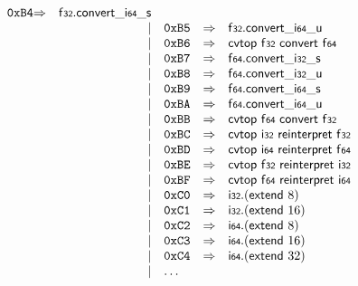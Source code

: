 $$\begin{array}{@{}l@{}rrlll@{}l@{}}
\mathtt{0xB4} &\Rightarrow& \mathsf{f{\scriptstyle32}} . {{{{\mathsf{convert}}{\mathsf{\_}}}{\mathsf{i{\scriptstyle64}}}}{\mathsf{\_}}}{\mathsf{s}} \\ &&|&
\mathtt{0xB5} &\Rightarrow& \mathsf{f{\scriptstyle32}} . {{{{\mathsf{convert}}{\mathsf{\_}}}{\mathsf{i{\scriptstyle64}}}}{\mathsf{\_}}}{\mathsf{u}} \\ &&|&
\mathtt{0xB6} &\Rightarrow& \mathsf{cvtop}~\mathsf{f{\scriptstyle32}}~\mathsf{convert}~\mathsf{f{\scriptstyle64}} \\ &&|&
\mathtt{0xB7} &\Rightarrow& \mathsf{f{\scriptstyle64}} . {{{{\mathsf{convert}}{\mathsf{\_}}}{\mathsf{i{\scriptstyle32}}}}{\mathsf{\_}}}{\mathsf{s}} \\ &&|&
\mathtt{0xB8} &\Rightarrow& \mathsf{f{\scriptstyle64}} . {{{{\mathsf{convert}}{\mathsf{\_}}}{\mathsf{i{\scriptstyle32}}}}{\mathsf{\_}}}{\mathsf{u}} \\ &&|&
\mathtt{0xB9} &\Rightarrow& \mathsf{f{\scriptstyle64}} . {{{{\mathsf{convert}}{\mathsf{\_}}}{\mathsf{i{\scriptstyle64}}}}{\mathsf{\_}}}{\mathsf{s}} \\ &&|&
\mathtt{0xBA} &\Rightarrow& \mathsf{f{\scriptstyle64}} . {{{{\mathsf{convert}}{\mathsf{\_}}}{\mathsf{i{\scriptstyle64}}}}{\mathsf{\_}}}{\mathsf{u}} \\ &&|&
\mathtt{0xBB} &\Rightarrow& \mathsf{cvtop}~\mathsf{f{\scriptstyle64}}~\mathsf{convert}~\mathsf{f{\scriptstyle32}} \\ &&|&
\mathtt{0xBC} &\Rightarrow& \mathsf{cvtop}~\mathsf{i{\scriptstyle32}}~\mathsf{reinterpret}~\mathsf{f{\scriptstyle32}} \\ &&|&
\mathtt{0xBD} &\Rightarrow& \mathsf{cvtop}~\mathsf{i{\scriptstyle64}}~\mathsf{reinterpret}~\mathsf{f{\scriptstyle64}} \\ &&|&
\mathtt{0xBE} &\Rightarrow& \mathsf{cvtop}~\mathsf{f{\scriptstyle32}}~\mathsf{reinterpret}~\mathsf{i{\scriptstyle32}} \\ &&|&
\mathtt{0xBF} &\Rightarrow& \mathsf{cvtop}~\mathsf{f{\scriptstyle64}}~\mathsf{reinterpret}~\mathsf{i{\scriptstyle64}} \\ &&|&
\mathtt{0xC0} &\Rightarrow& \mathsf{i{\scriptstyle32}} . (\mathsf{extend}~8) \\ &&|&
\mathtt{0xC1} &\Rightarrow& \mathsf{i{\scriptstyle32}} . (\mathsf{extend}~16) \\ &&|&
\mathtt{0xC2} &\Rightarrow& \mathsf{i{\scriptstyle64}} . (\mathsf{extend}~8) \\ &&|&
\mathtt{0xC3} &\Rightarrow& \mathsf{i{\scriptstyle64}} . (\mathsf{extend}~16) \\ &&|&
\mathtt{0xC4} &\Rightarrow& \mathsf{i{\scriptstyle64}} . (\mathsf{extend}~32) \\ &&|&
\dots \\
\end{array}
$$

